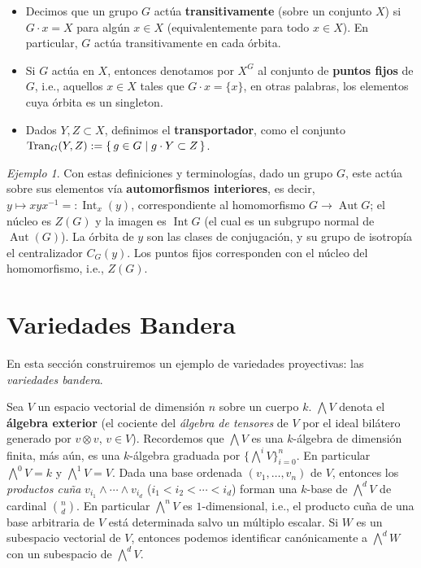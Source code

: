 \documentclass[spanish,12pt]{amsart}
\theoremstyle{definition}
\theoremstyle{remark}
\newtheorem{example}[theorem]{Ejemplo}
\numberwithin{equation}{section}
\begin{document}
\begin{itemize}
\item Decimos que un grupo $G$ actúa \textbf{transitivamente} (sobre un conjunto $X$) si $G \cdot x = X$ para algún $x \in X$ (equivalentemente para todo $x \in X$). En particular, $G$ actúa transitivamente en cada órbita.
\item Si $G$ actúa en $X$, entonces denotamos por $X^{G}$ al conjunto de \textbf{puntos fijos} de $G$, i.e., aquellos $x \in X$ tales que $G \cdot x = \{x\}$, en otras palabras, los elementos cuya órbita es un singleton.
\item Dados $Y,Z \subset X$, definimos el \textbf{transportador}, como el conjunto $\operatorname{Tran}_G (Y, Z) := \set{g \in G | g \cdot Y \subset Z}$.
\end{itemize}

\begin{example}
Con estas definiciones y terminologías, dado un grupo $G$, este actúa sobre sus elementos vía \textbf{automorfismos interiores}, es decir, $y \mapsto x y x^{-1} =: \operatorname{Int}_x (y)$, correspondiente al homomorfismo $G \to \operatorname{Aut}G$; el núcleo es $Z(G)$ y la imagen es $\operatorname{Int} G$ (el cual es un subgrupo normal de $\operatorname{Aut} (G)$). La órbita de $y$ son las clases de conjugación, y su grupo de isotropía el centralizador $C_G (y)$. Los puntos fijos corresponden con el núcleo del homomorfismo, i.e., $Z(G)$.
\end{example}


\section{Variedades Bandera}

En esta sección construiremos un ejemplo de variedades proyectivas: las \textit{variedades bandera}.

Sea $V$ un espacio vectorial de dimensión $n$ sobre un cuerpo $k$. $\bigwedge V$ denota el \textbf{álgebra exterior} (el cociente del \textit{álgebra de tensores} de $V$ por el ideal bilátero generado por $v \otimes v$, $v \in V$). Recordemos que $\bigwedge V$ es una $k$-álgebra de dimensión finita, más aún, es una $k$-álgebra graduada por $\{\bigwedge^i V\}_{i = 0}^n$. En particular $\bigwedge^0 V = k$ y $\bigwedge^1 V = V$. Dada una base ordenada $(v_1, \ldots, v_n)$ de $V$, entonces los \textit{productos cuña} $v_{i_1} \wedge \cdots \wedge v_{i_d}$ ($i_1 < i_2 < \cdots < i_d$) forman una $k$-base de $\bigwedge^d V$ de cardinal $\binom n d$. En particular $\bigwedge^n V$ es $1$-dimensional, i.e., el producto cuña de una base arbitraria de $V$ está determinada salvo un múltiplo escalar. Si $W$ es un subespacio vectorial de $V$, entonces podemos identificar canónicamente a $\bigwedge^d W$ con un subespacio de $\bigwedge^d V$.
\end{document}
